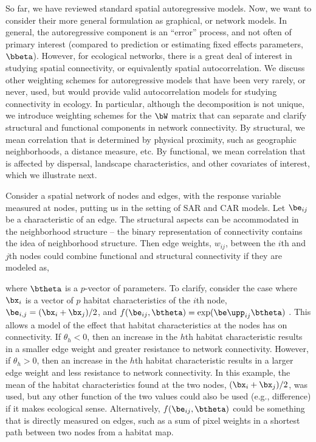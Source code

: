 So far, we have reviewed standard spatial autoregressive models. Now, we want to consider their more general formulation as graphical, or network models. In general, the autoregressive component is an ``error'' process, and not often of primary interest (compared to prediction or estimating fixed effects parameters, $\bbeta$).  However, for ecological networks, there is a great deal of interest in studying spatial connectivity, or equivalently spatial autocorrelation. We discuss other weighting schemes for autoregressive models that have been very rarely, or never, used, but would provide valid autocorrelation models for studying connectivity in ecology.  In particular, although the decomposition is not unique, we introduce weighting schemes for the $\bW$ matrix that can separate and clarify structural and functional components in network connectivity.  By structural, we mean correlation that is determined by physical proximity, such as geographic neighborhoods, a distance measure, etc.  By functional, we mean correlation that is affected by dispersal, landscape characteristics, and other covariates of interest, which we illustrate next.

Consider a spatial network of nodes and edges, with the response variable measured at nodes, putting us in the setting of SAR and CAR models.  Let $\be_{ij}$ be a characteristic of an edge. The structural aspects can be accommodated in the neighborhood structure -- the binary representation of connectivity contains the idea of neighborhood structure. Then edge weights, $w_{ij}$, between the $i$th and $j$th nodes could combine functional and structural connectivity if they are modeled as,

where $\btheta$ is a $p$-vector of parameters.  To clarify, consider the case where $\bx_i$ is a vector of $p$ habitat characteristics of the $i$th node, $\be_{i,j} = (\bx_i +\bx_j)/2$, and $f(\be_{ij},\btheta) = \exp(\be\upp_{ij}\btheta)$ \citep{Hank:Hoot:circ:2013}. This allows a model of the effect that habitat characteristics at the nodes has on connectivity. If $\theta_h < 0$, then an increase in the $h$th habitat characteristic results in a smaller edge weight and greater resistance to network connectivity. However, if $\theta_h > 0$, then an increase in the $h$th habitat characteristic results in a larger edge weight and less resistance to network connectivity. In this example, the mean of the habitat characteristics found at the two nodes, $(\bx_i +\bx_j)/2$, was used, but any other function of the two values could also be used (e.g., difference) if it makes ecological sense.  Alternatively, $f(\be_{ij},\btheta)$ could be something that is directly measured on edges, such as a sum of pixel weights in a shortest path between two nodes from a habitat map.   

